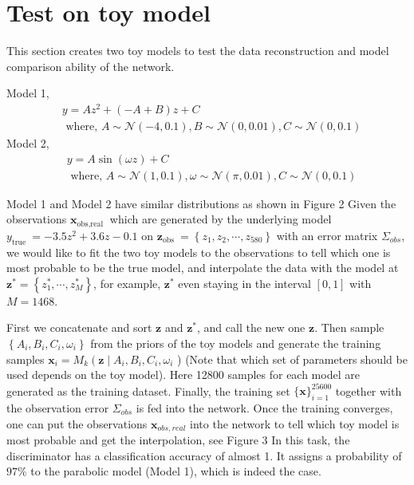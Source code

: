 \section{Test on toy model}
This section creates two toy models to test the data reconstruction and model comparison ability of the network.

Model 1,
$$
\begin{aligned}
&y=A z^{2}+(-A+B) z+C \\
&\text { where, } A \sim \mathcal{N}(-4,0.1), B \sim \mathcal{N}(0,0.01), C \sim \mathcal{N}(0,0.1)
\end{aligned}
$$
Model 2,
$$
\begin{aligned}
&y=A \sin (\omega z)+C \\
&\text { where, } A \sim \mathcal{N}(1,0.1), \omega \sim \mathcal{N}(\pi, 0.01), C \sim \mathcal{N}(0,0.1)
\end{aligned}
$$

Model 1 and Model 2 have similar distributions as shown in Figure 2 Given the observations $\boldsymbol{x}_{\text {obs,real }}$ which are generated by the underlying model $y_{\text {true }}=-3.5 z^{2}+3.6 z-0.1$ on $\boldsymbol{z}_{\text {obs }}=\left\{z_{1}, z_{2}, \cdots, z_{580}\right\}$ with an error matrix $\Sigma_{o b s}$, we would like to fit the two toy models to the observations to tell which one is most probable to be the true model, and interpolate the data with the model at $\boldsymbol{z}^{*}=\left\{z_{1}^{*}, \cdots, z_{M}^{*}\right\}$, for example, $\boldsymbol{z}^{*}$ even staying in the interval $[0,1]$ with $M=1468$.

First we concatenate and sort $\boldsymbol{z}$ and $\boldsymbol{z}^{*}$, and call the new one $\boldsymbol{z}$. Then sample $\left\{A_{i}, B_{i}, C_{i}, \omega_{i}\right\}$ from the priors of the toy models and generate the training samples $\boldsymbol{x}_{i}=M_{k}\left(\boldsymbol{z} \mid A_{i}, B_{i}, C_{i}, \omega_{i}\right.$ ) (Note that which set of parameters should be used depends on the toy model). Here 12800 samples for each model are generated as the training dataset. Finally, the training set $\{\boldsymbol{x}\}_{i=1}^{25600}$ together with the observation error $\Sigma_{o b s}$ is fed into the network. Once the training converges, one can put the observations $\boldsymbol{x}_{o b s, r e a l}$ into the network to tell which toy model is most probable and get the interpolation, see Figure 3 In this task, the discriminator has a classification accuracy of almost 1. It assigns a probability of $97 \%$ to the parabolic model (Model 1), which is indeed the case.